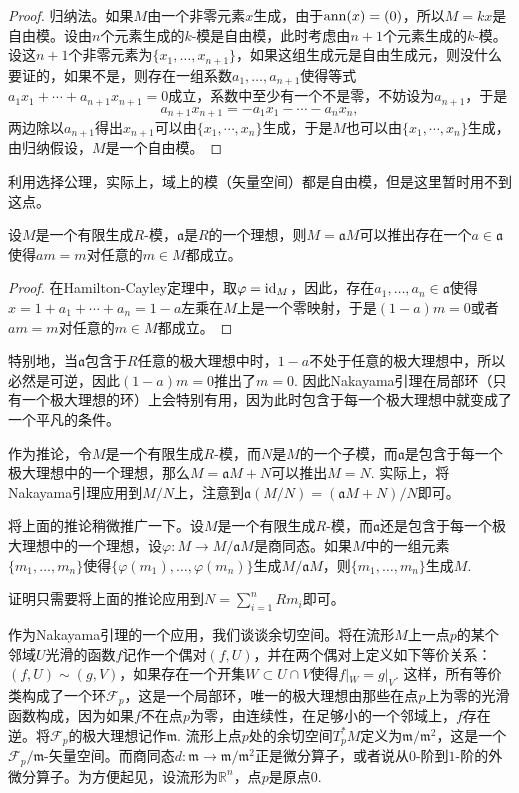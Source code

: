 \begin{proof}
	归纳法。如果$M$由一个非零元素$x$生成，由于$\operatorname{ann}(x)=(0)$，所以$M=kx$是自由模。设由$n$个元素生成的$k$-模是自由模，此时考虑由$n+1$个元素生成的$k$-模。设这$n+1$个非零元素为$\{x_1,\dots,x_{n+1}\}$，如果这组生成元是自由生成元，则没什么要证的，如果不是，则存在一组系数$a_1,\dots,a_{n+1}$使得等式$a_1x_1+\cdots+a_{n+1}x_{n+1}=0$成立，系数中至少有一个不是零，不妨设为$a_{n+1}$，于是
	\[
	a_{n+1}x_{n+1}=-a_1x_1-\cdots-a_nx_n,
	\]
	两边除以$a_{n+1}$得出$x_{n+1}$可以由$\{x_1,\cdots,x_{n}\}$生成，于是$M$也可以由$\{x_1,\cdots,x_{n}\}$生成，由归纳假设，$M$是一个自由模。
\end{proof}

利用选择公理，实际上，域上的模（矢量空间）都是自由模，但是这里暂时用不到这点。

\begin{thm}[Nakayama引理]
设$M$是一个有限生成$R$-模，$\mathfrak{a}$是$R$的一个理想，则$M=\mathfrak{a}M$可以推出存在一个$a\in \mathfrak{a}$使得$am=m$对任意的$m\in M$都成立。
\end{thm}

\begin{proof}
	在Hamilton-Cayley定理中，取$\varphi=\operatorname{id}_M$，因此，存在$a_1,\dots,a_n\in \mathfrak{a}$使得$x=1+a_1+\cdots+a_n=1-a$左乘在$M$上是一个零映射，于是$(1-a)m=0$或者$am=m$对任意的$m\in M$都成立。
\end{proof}

特别地，当$\mathfrak{a}$包含于$R$任意的极大理想中时，$1-a$不处于任意的极大理想中，所以必然是可逆，因此$(1-a)m=0$推出了$m=0$. 因此Nakayama引理在局部环（只有一个极大理想的环）上会特别有用，因为此时包含于每一个极大理想中就变成了一个平凡的条件。

作为推论，令$M$是一个有限生成$R$-模，而$N$是$M$的一个子模，而$\mathfrak{a}$是包含于每一个极大理想中的一个理想，那么$M=\mathfrak{a}M+N$可以推出$M=N$. 实际上，将Nakayama引理应用到$M/N$上，注意到$\mathfrak{a}(M/N)=(\mathfrak{a}M+N)/N$即可。

\begin{pro}
将上面的推论稍微推广一下。设$M$是一个有限生成$R$-模，而$\mathfrak{a}$还是包含于每一个极大理想中的一个理想，设$\varphi:M\to M/\mathfrak{a}M$是商同态。如果$M$中的一组元素$\{m_1,\dots,m_n\}$使得$\{\varphi(m_1),\dots,\varphi(m_n)\}$生成$M/\mathfrak{a}M$，则$\{m_1,\dots,m_n\}$生成$M$.
\end{pro}

证明只需要将上面的推论应用到$N=\sum_{i=1}^n Rm_i$即可。

\para \label{3.2.14} 作为Nakayama引理的一个应用，我们谈谈余切空间。将在流形$M$上一点$p$的某个邻域$U$光滑的函数$f$记作一个偶对$(f,U)$，并在两个偶对上定义如下等价关系：$(f,U)\sim (g,V)$，如果存在一个开集$W\subset U\cap V$使得$f|_W=g|_V$. 这样，所有等价类构成了一个环$\mathcal{F}_p$，这是一个局部环，唯一的极大理想由那些在点$p$上为零的光滑函数构成，因为如果$f$不在点$p$为零，由连续性，在足够小的一个邻域上，$f$存在逆。将$\mathcal{F}_p$的极大理想记作$\mathfrak{m}$. 流形上点$p$处的余切空间$T_p^*M$定义为$\mathfrak{m}/\mathfrak{m}^2$，这是一个$\mathcal{F}_p/\mathfrak{m}$-矢量空间。而商同态$d:\mathfrak{m}\to \mathfrak{m}/\mathfrak{m}^2$正是微分算子，或者说从$0$-阶到$1$-阶的外微分算子。为方便起见，设流形为$\mathbb{R}^n$，点$p$是原点$0$.

